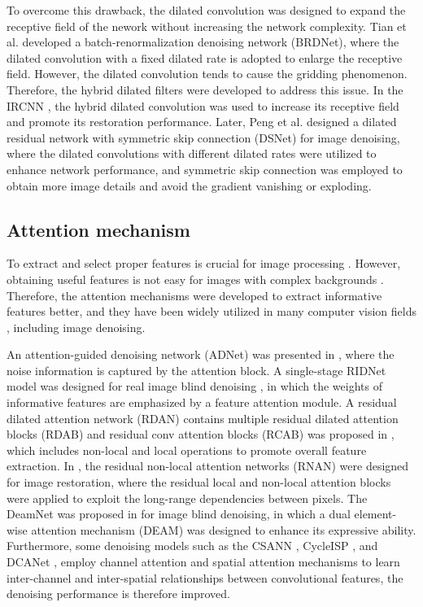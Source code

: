 \documentclass[3p,times]{elsarticle}
\begin{document}
To overcome this drawback, the dilated convolution \cite{Yu2015} was designed to expand the receptive field of the nework without increasing the network complexity. Tian et al. \cite{Tian2020} developed a batch-renormalization denoising network (BRDNet), where the dilated convolution with a fixed dilated rate is adopted to enlarge the receptive field. However, the dilated convolution tends to cause the gridding phenomenon. Therefore, the hybrid dilated filters \cite{Yu2017, Wang2018} were developed to address this issue. In the IRCNN \cite{ZhangZGZ2017}, the hybrid dilated convolution was used to increase its receptive field and promote its restoration performance. Later, Peng et al. \cite{Peng2019} designed a dilated residual network with symmetric skip connection (DSNet) for image denoising, where the dilated convolutions with different dilated rates were utilized to enhance network performance, and symmetric skip connection was employed to obtain more image details and avoid the gradient vanishing or exploding.

\subsection{Attention mechanism}
To extract and select proper features is crucial for image processing \cite{Du2019, Li2021, Liang2021}. However, obtaining useful features is not easy for images with complex backgrounds \cite{Li2019}. Therefore, the attention mechanisms \cite{Hu2018, Woo2018} were developed to extract informative features better, and they have been widely utilized in many computer vision fields \cite{ZhangL2018, Dai2019, Lyn2020}, including image denoising.

An attention-guided denoising network (ADNet) was presented in \cite{TianX2020}, where the noise information is captured by the attention block. A single-stage RIDNet model was designed for real image blind denoising \cite{Anwar2019}, in which the weights of informative features are emphasized by a feature attention module. A residual dilated attention network (RDAN) contains multiple residual dilated attention blocks (RDAB) and residual conv attention blocks (RCAB) was proposed in \cite{Hou2019}, which includes non-local and local operations to promote overall feature extraction. In \cite{Zhang2019}, the residual non-local attention networks (RNAN) were designed for image restoration, where the residual local and non-local attention blocks were applied to exploit the long-range dependencies between pixels. The DeamNet was proposed in \cite{Ren2021} for image blind denoising, in which a dual element-wise attention mechanism (DEAM) was designed to enhance its expressive ability. Furthermore, some denoising models such as the CSANN \cite{Wang2021}, CycleISP \cite{Zamir2020}, and DCANet \cite{WuG2023}, employ channel attention \cite{Hu2018} and spatial attention \cite{Woo2018} mechanisms to learn inter-channel and inter-spatial relationships between convolutional features, the denoising performance is therefore improved.
\end{document}
